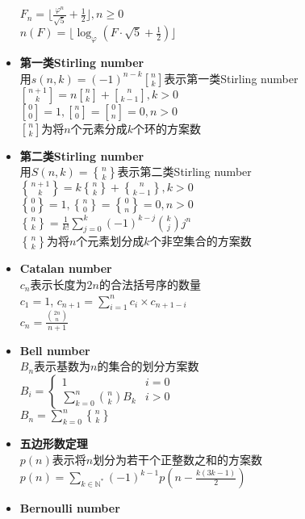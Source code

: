 \begin{itemize}
			\\$ F_n = \lfloor \frac{\varphi^n}{\sqrt{5}} + \frac{1}{2} \rfloor, n \geq 0 $
			\\$ n(F) = \lfloor \log_\varphi(F \cdot \sqrt{5} + \frac{1}{2}) \rfloor $
		\item \textbf{第一类Stirling number}
			\\用$ s(n, k) = (-1) ^ {n - k} {n \brack k} $表示第一类Stirling number
			\\$ {n + 1 \brack k} = n {n \brack k} + {n \brack k - 1}, k > 0 $
			\\$ {0 \brack 0} = 1, {n \brack 0} = {0 \brack n} = 0, n > 0 $
			\\$ {n \brack k} $为将$ n $个元素分成$ k $个环的方案数
		\item \textbf{第二类Stirling number}
			\\用$ S(n, k) = {n \brace k} $表示第二类Stirling number
			\\$ {n + 1 \brace k} = k {n \brace k} + {n \brace k - 1}, k > 0 $
			\\$ {0 \brace 0} = 1, {n \brace 0} = {0 \brace n} = 0, n > 0 $
			\\$ {n \brace k} = \frac{1}{k!} \sum\limits_{j = 0}^{k} (-1) ^ {k - j} \binom{k}{j} j ^ n $
			\\$ {n \brace k} $为将$ n $个元素划分成$ k $个非空集合的方案数
		\item \textbf{Catalan number}
			\\$ c_n $表示长度为$ 2n $的合法括号序的数量
			\\$ c_1 = 1 $, $ c_{n+1} = \sum\limits_{i=1}^{n} c_i \times c_{n + 1 - i} $
			\\$ c_n = \frac{\binom{2n}{n}}{n + 1} $
		\item \textbf{Bell number}
			\\$ B_n $表示基数为$ n $的集合的划分方案数
			\\$ B_i = \begin{cases}
				1 & i = 0\\
				\sum\limits_{k = 0}^{n} \binom{n}{k} B_k & i > 0
			\end{cases} $
			\\$ B_n = \sum\limits_{k = 0}^{n} {n \brace k} $
		\item \textbf{五边形数定理}
			\\$ p(n) $表示将$ n $划分为若干个正整数之和的方案数
			\\$ p(n) = \sum\limits_{k \in \mathbb{N}^\ast} (-1)^{k - 1} p(n - \frac{k(3k - 1)}{2}) $
		\item \textbf{Bernoulli number}

\end{itemize}
